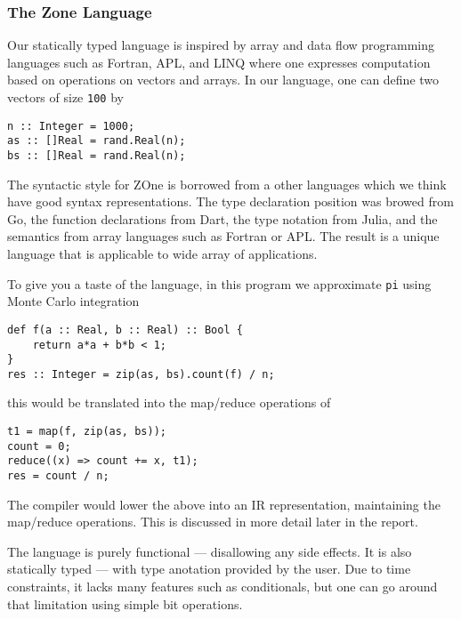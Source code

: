 \subsubsection{The Zone Language}
\label{sec:zonelang}

Our statically typed language is inspired by array and data flow
programming languages such as Fortran\cite{Fortran}, APL\cite{APL}, and
LINQ\cite{LINQ} where one expresses computation based on operations on
vectors and arrays. In our language, one can define two vectors of size
\texttt{100} by

\begin{verbatim}
n :: Integer = 1000;
as :: []Real = rand.Real(n);
bs :: []Real = rand.Real(n); 
\end{verbatim}


The syntactic style for ZOne is borrowed from a other languages
	which we think have good syntax representations.
The type declaration position was browed from Go\cite{golang},
	the function declarations from Dart\cite{dartlang},
	the type notation from Julia\cite{julialang},
	and the semantics from array languages such as Fortran\cite{Fortran} or APL\cite{APL}.
The result is a unique language that is applicable to wide array
	of applications.



To give you a taste of the language, in this program we approximate
\texttt{pi} using Monte Carlo integration

\begin{verbatim}
def f(a :: Real, b :: Real) :: Bool {
	return a*a + b*b < 1;
}
res :: Integer = zip(as, bs).count(f) / n;
\end{verbatim}

this would be translated into the map/reduce operations of

\begin{verbatim}
t1 = map(f, zip(as, bs));
count = 0;
reduce((x) => count += x, t1);
res = count / n;
\end{verbatim}

The compiler would lower the above into an IR representation,
maintaining the map/reduce operations. This is discussed 
in more detail later in the report.


The language is purely functional --- disallowing any side effects.
It is also statically typed --- with type anotation provided by the user.
Due to time constraints, it lacks many features such as conditionals, but 
	one can go around that limitation using simple bit operations.


